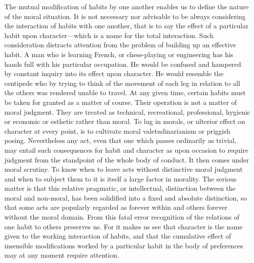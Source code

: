 \documentclass[12pt]{article}
\begin{document}
The mutual modification of habits by one another
enables us to define the nature of the moral situation.
It is not necessary nor advisable to be always considering
the interaction of habits with one another, that
is to say the effect of a particular habit upon character---which
is a name for the total interaction. Such
consideration distracts attention from the problem of
building up an effective habit. A man who is learning
French, or chess-playing or engineering has his hands
full with his particular occupation. He would be confused
and hampered by constant inquiry into its effect
upon character. He would resemble the centipede who
by trying to think of the movement of each leg in relation
to all the others was rendered unable to travel.
At any given time, certain habits must be taken for
granted as a matter of course. Their operation is not
a matter of moral judgment. They are treated as
technical, recreational, professional, hygienic or economic
or esthetic rather than moral. To lug in morals,
or ulterior effect on character at every point, is to
cultivate moral valetudinarianism or priggish posing.
Nevertheless any act, even that one which passes ordinarily
as trivial, may entail such consequences for habit
and character as upon occasion to require judgment
from the standpoint of the whole body of conduct. It
then comes under moral scrutiny. To know when to
leave acts without distinctive moral judgment and
when to subject them to it is itself a large factor in
morality. The serious matter is that this relative
pragmatic, or intellectual, distinction between the moral
and non-moral, has been solidified into a fixed and absolute
distinction, so that some acts are popularly regarded
as forever within and others forever without the
moral domain. From this fatal error recognition of the
relations of one habit to others preserves us. For it
makes us see that character is the name given to the
working interaction of habits, and that the cumulative
effect of insensible modifications worked by a particular
habit in the body of preferences may at any moment
require attention.
\end{document}

